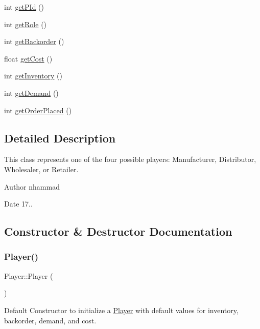 \begin{DoxyCompactItemize}
int \hyperlink{classPlayer_ad815840dfa1c1261900774b5ffd886e3}{get\+P\+Id} ()
\item 
int \hyperlink{classPlayer_a6baeff2a6218449299cb334c01f1dc28}{get\+Role} ()
\item 
int \hyperlink{classPlayer_a8080e44c26141d956babb824d2a7ae7c}{get\+Backorder} ()
\item 
float \hyperlink{classPlayer_a0fd8247cc0326d8df1051bd83928cf2c}{get\+Cost} ()
\item 
int \hyperlink{classPlayer_ae21d65a545c20c70ac7a53389b223ce6}{get\+Inventory} ()
\item 
int \hyperlink{classPlayer_a8bfca991628b682ff9cae6d05ee9131c}{get\+Demand} ()
\item 
int \hyperlink{classPlayer_af838b44639ee94d4185917d5d2259ce2}{get\+Order\+Placed} ()
\end{DoxyCompactItemize}


\subsection{Detailed Description}
This class represents one of the four possible players\+: Manufacturer, Distributor, Wholesaler, or Retailer.

\begin{DoxyAuthor}{Author}
nhammad 
\end{DoxyAuthor}
\begin{DoxyDate}{Date}
17.. 
\end{DoxyDate}


\subsection{Constructor \& Destructor Documentation}
\mbox{\label{classPlayer_affe0cc3cb714f6deb4e62f0c0d3f1fd8}} 
\subsubsection{\texorpdfstring{Player()}{Player()}}
{\footnotesize\ttfamily Player\+::\+Player (\begin{DoxyParamCaption}{ }\end{DoxyParamCaption})}

Default Constructor to initialize a \hyperlink{classPlayer}{Player} with default values for inventory, backorder, demand, and cost. 

